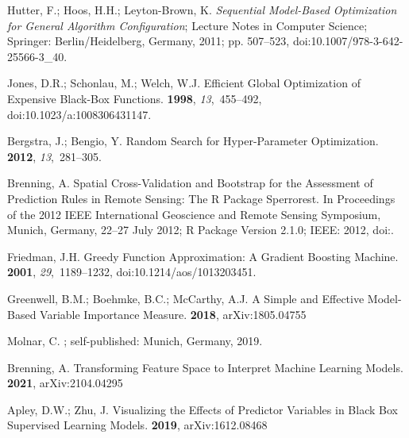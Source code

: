 \documentclass[remotesensing,article,accept,moreauthors,pdftex]{Definitions/mdpi}
\begin{document}
\begin{thebibliography}{999}
Hutter, F.; Hoos, H.H.; {Leyton-Brown}, K.
\newblock \emph{Sequential Model-Based Optimization for General Algorithm
  Configuration}; Lecture {{Notes}} in {{Computer Science}}; {Springer:
  Berlin/Heidelberg, Germany},  2011; pp. 507--523, doi:10.1007/978-3-642-25566-3\_40.

Jones, D.R.; Schonlau, M.; Welch, W.J.
\newblock Efficient Global Optimization of Expensive Black-Box Functions.
 {\bf 1998}, {\em 13},~455--492, doi:10.1023/a:1008306431147.

Bergstra, J.; Bengio, Y.
\newblock Random {{Search}} for {{Hyper}}-Parameter {{Optimization}}.
 {\bf 2012}, {\em 13},~281--305.

Brenning, A.
\newblock Spatial Cross-Validation and Bootstrap for the Assessment of
  Prediction Rules in Remote Sensing: The {{R}} Package Sperrorest.
\newblock  In Proceedings of the 2012 {{IEEE International Geoscience}} and {{Remote Sensing
  Symposium}}, Munich, Germany, 22--27 July 2012; {R} Package Version 2.1.0; {IEEE}:  2012,
\newblock
  doi:{\href{https://doi.org/10.1109/igarss.2012.6352393}{}}.

Friedman, J.H.
\newblock Greedy Function Approximation: A Gradient Boosting Machine.
 {\bf 2001}, {\em 29},~1189--1232, doi:10.1214/aos/1013203451.

Greenwell, B.M.; Boehmke, B.C.; McCarthy, A.J.
\newblock A {{Simple}} and {{Effective Model}}-{{Based Variable Importance
  Measure}}.
 {\bf 2018}, arXiv:1805.04755

Molnar, C.
; self-published: Munich, Germany, 2019.


Brenning, A.
\newblock Transforming {{Feature Space}} to {{Interpret Machine Learning
  Models}}.
 {\bf 2021}, arXiv:2104.04295

Apley, D.W.; Zhu, J.
\newblock Visualizing the {{Effects}} of {{Predictor Variables}} in {{Black Box
  Supervised Learning Models}}.
 {\bf 2019}, arXiv:1612.08468


\end{thebibliography}
\end{document}
